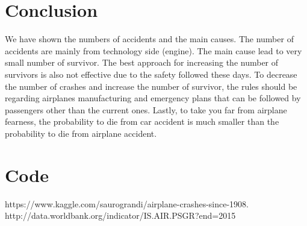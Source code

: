 \documentclass[journal]{IEEEtran}
\begin{document}
\section{Conclusion}
We have shown the numbers of accidents and the main causes. The number of accidents are mainly from
technology side (engine). The main cause lead to very small number of survivor. The best approach for increasing the
number of survivors is also not effective due to the safety followed these days. To decrease the number of crashes and increase the
number of survivor, the rules should be
regarding airplanes manufacturing and emergency plans that can be followed by passengers other than the current ones. Lastly, to take you far from airplane fearness, the probability to die from
car accident is much smaller than the probability to die from airplane accident.

\newpage
\appendices
\section{Code}


\begin{thebibliography}{1}

https://www.kaggle.com/saurograndi/airplane-crashes-since-1908.
http://data.worldbank.org/indicator/IS.AIR.PSGR?end=2015

\end{thebibliography}
\end{document}
